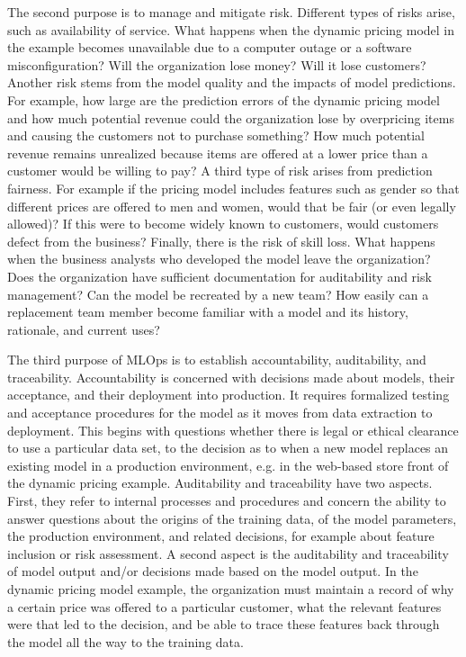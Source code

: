 The second purpose is to manage and mitigate risk. Different types of risks arise, such as availability of service. What happens when the dynamic pricing model in the example becomes unavailable due to a computer outage or a software misconfiguration? Will the organization lose money? Will it lose customers? Another risk stems from the model quality and the impacts of model predictions. For example, how large are the prediction errors of the dynamic pricing model and how much potential revenue could the organization lose by overpricing items and causing the customers not to purchase something? How much potential revenue remains unrealized because items are offered at a lower price than a customer would be willing to pay? A third type of risk arises from prediction fairness. For example if the pricing model includes features such as gender so that different prices are offered to men and women, would that be fair (or even legally allowed)? If this were to become widely known to customers, would customers defect from the business? Finally, there is the risk of skill loss. What happens when the business analysts who developed the model leave the organization? Does the organization have sufficient documentation for auditability and risk management? Can the model be recreated by a new team? How easily can a replacement team member become familiar with a model and its history, rationale, and current uses?

The third purpose of MLOps is to establish accountability, auditability, and traceability. Accountability is concerned with decisions made about models, their acceptance, and their deployment into production. It requires formalized testing and acceptance procedures for the model as it moves from data extraction to deployment. This begins with questions whether there is legal or ethical clearance to use a particular data set, to the decision as to when a new model replaces an existing model in a production environment, e.g. in the web-based store front of the dynamic pricing example. Auditability and traceability have two aspects. First, they refer to internal processes and procedures and concern the ability to answer questions about the origins of the training data, of the model parameters, the production environment, and related decisions, for example about feature inclusion or risk assessment. A second aspect is the auditability and traceability of model output and/or decisions made based on the model output. In the dynamic pricing model example, the organization must maintain a record of why a certain price was offered to a particular customer, what the relevant features were that led to the decision, and be able to trace these features back through the model all the way to the training data. 

